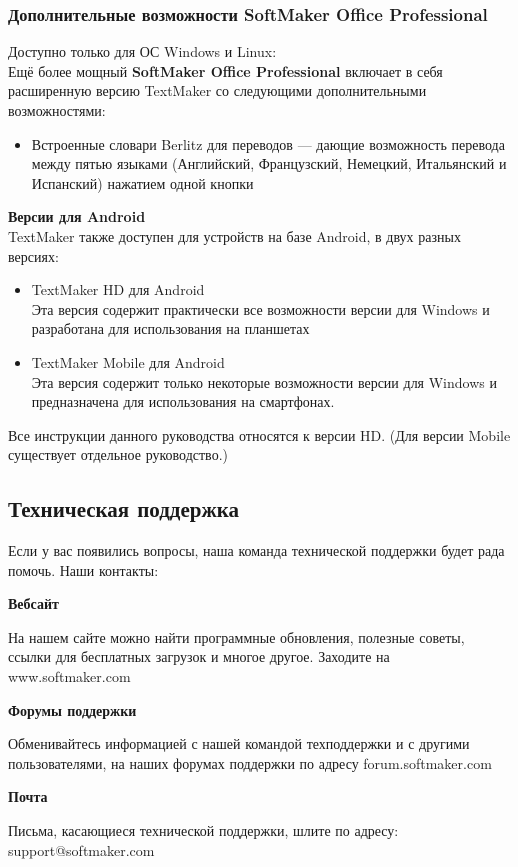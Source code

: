 \documentclass[a4paper,10pt]{article}
\begin{document}
\subsubsection{Дополнительные возможности SoftMaker Office Professional}
Доступно только для ОС Windows и Linux:\\
Ещё более мощный \textbf{SoftMaker Office Professional} включает в себя расширенную версию TextMaker со следующими дополнительными возможностями:
\begin{itemize}
 \item Встроенные словари Berlitz для переводов --- дающие возможность перевода между пятью языками (Английский, Французский, Немецкий, Итальянский и Испанский) нажатием одной кнопки
\end{itemize}
\textbf{Версии для Android}\\
TextMaker также доступен для устройств на базе Android, в двух разных версиях:
\begin{itemize}
 \item TextMaker HD для Android\\
Эта версия содержит практически  все возможности версии для Windows и разработана для использования на планшетах
\item TextMaker Mobile для Android\\
Эта версия содержит только некоторые возможности версии для Windows и предназначена для использования на смартфонах.
\end{itemize}
Все инструкции данного руководства относятся к версии HD. (Для версии Mobile существует отдельное руководство.)
\subsection{Техническая поддержка}
Если у вас появились вопросы, наша команда технической поддержки будет рада помочь. Наши контакты:

\textbf{Вебсайт}

На нашем сайте можно найти программные обновления, полезные советы, ссылки для бесплатных загрузок и многое другое. Заходите на www.softmaker.com

\textbf{Форумы поддержки}

Обменивайтесь информацией с нашей командой техподдержки и с другими пользователями, на наших форумах поддержки по адресу forum.softmaker.com

\textbf{Почта}

Письма, касающиеся технической поддержки, шлите по адресу: support@softmaker.com
\end{document}

